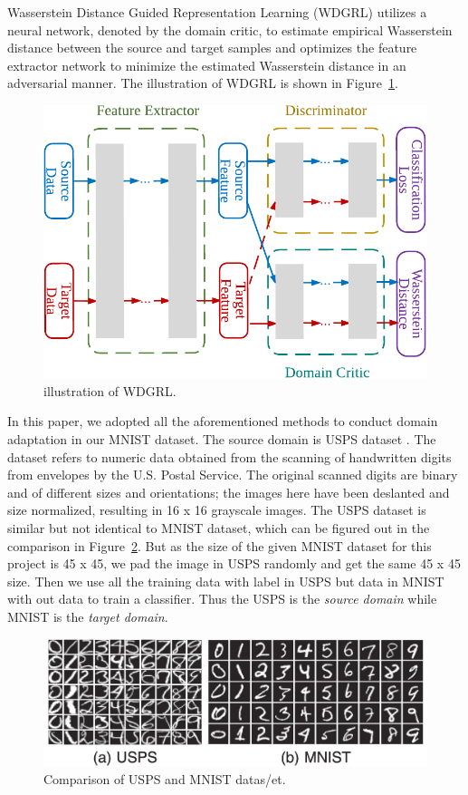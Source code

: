 \documentclass{article} %
\begin{document}
Wasserstein Distance Guided Representation Learning (WDGRL) \cite{shen2017adversarial} utilizes a neural network, denoted by the domain critic, to estimate empirical Wasserstein distance between the source and target samples and optimizes the feature extractor network to minimize the estimated Wasserstein distance in an adversarial manner. The illustration of WDGRL is shown in Figure~\ref{fig:wd}.

\begin{figure}[H]
\centering
\includegraphics[width=0.7\linewidth]{figs/wd}
\caption{illustration of WDGRL.}
\label{fig:wd}
\end{figure}


In this paper, we adopted all the aforementioned methods to conduct domain adaptation in our MNIST dataset. The source domain is USPS dataset \cite{proedrou2002transductive}. The dataset refers to numeric data obtained from the scanning of handwritten digits from envelopes by the U.S. Postal Service. The original scanned digits are binary and of different sizes and orientations; the images here have been deslanted and size normalized, resulting in 16 x 16 grayscale images. The USPS dataset is similar but not identical to MNIST dataset, which can be figured out in the comparison in Figure~\ref{fig:usps-mnist}. But as the size of the given MNIST dataset for this project is 45 x 45, we pad the image in USPS randomly and get the same 45 x 45 size. Then we use all the training data with label in USPS but data in MNIST with out data to train a classifier. Thus the USPS is the \textit{source domain} while MNIST is the \textit{target domain}.

\begin{figure}[H]
\centering
\includegraphics[width=0.7\linewidth]{figs/usps-mnist}
\caption{Comparison of USPS and MNIST datas/et.}
\label{fig:usps-mnist}
\end{figure}
\end{document}
